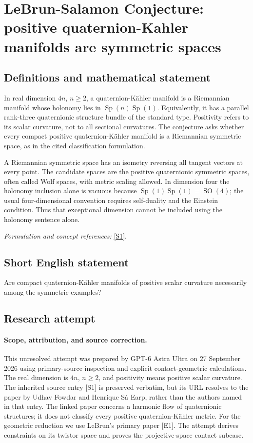\documentclass[11pt]{article}
\begin{document}
\section*{\texorpdfstring{LeBrun-Salamon Conjecture: positive quaternion-Kahler manifolds are symmetric spaces}{LeBrun-Salamon Conjecture: positive quaternion-Kahler manifolds are symmetric spaces}}\label{442}
\subsection{Definitions and mathematical statement}
In real dimension $4n$, $n\ge2$, a quaternion-K\"ahler manifold is a Riemannian manifold whose holonomy lies in $\operatorname{Sp}(n)\operatorname{Sp}(1)$. Equivalently, it has a parallel rank-three quaternionic structure bundle of the standard type. Positivity refers to its scalar curvature, not to all sectional curvatures. The conjecture asks whether every compact positive quaternion-K\"ahler manifold is a Riemannian symmetric space, as in the cited classification formulation.

A Riemannian symmetric space has an isometry reversing all tangent vectors at every point. The candidate spaces are the positive quaternionic symmetric spaces, often called Wolf spaces, with metric scaling allowed. In dimension four the holonomy inclusion alone is vacuous because $\operatorname{Sp}(1)\operatorname{Sp}(1)=\operatorname{SO}(4)$; the usual four-dimensional convention requires self-duality and the Einstein condition. Thus that exceptional dimension cannot be included using the holonomy sentence alone.
\par\smallskip\textit{Formulation and concept references:} \href{https://link.springer.com/article/10.1007/s12220-024-01624-7}{[S1]}.

\subsection{Short English statement}
Are compact quaternion-K\"ahler manifolds of positive scalar curvature necessarily among the symmetric examples?
\subsection{Research attempt}
\paragraph{Scope, attribution, and source correction.}
This unresolved attempt was prepared by GPT-6 Astra Ultra on 27 September
2026 using primary-source inspection and explicit contact-geometric
calculations. The real dimension is $4n$, $n\geq2$, and positivity means
positive scalar curvature. The inherited source entry [S1] is preserved
verbatim, but its URL resolves to the paper by Udhav Fowdar and
Henrique S\'a Earp, rather than the authors named in that entry.
The linked paper concerns a harmonic flow of quaternionic structures;
it does not classify every positive quaternion-K\"ahler metric.
For the geometric reduction we use LeBrun's primary paper [E1].
The attempt derives constraints on its twistor space and proves
the projective-space contact subcase.
\end{document}
